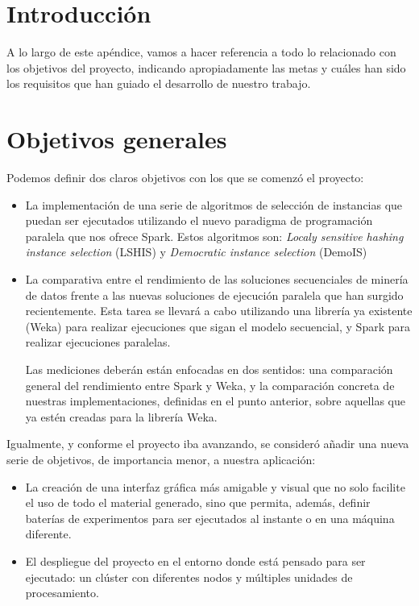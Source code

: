 

\section{Introducción}

A lo largo de este apéndice, vamos a hacer referencia a todo lo relacionado con los objetivos del proyecto, indicando apropiadamente las metas y cuáles han sido los requisitos que han guiado el desarrollo de nuestro trabajo.

\section{Objetivos generales}

Podemos definir dos claros objetivos con los que se comenzó el proyecto:
\begin{itemize}

\item La implementación de una serie de algoritmos de selección de instancias que puedan ser ejecutados utilizando el nuevo paradigma de programación paralela que nos ofrece Spark. Estos algoritmos son: \textit{Localy sensitive hashing instance selection} (LSHIS) \cite{LSHISPaper} y \textit{Democratic instance selection} (DemoIS) \cite{DemoISPaper}

\item La comparativa entre el rendimiento de las soluciones secuenciales de minería de datos frente a las nuevas soluciones de ejecución paralela que han surgido recientemente. Esta tarea se llevará a cabo utilizando una librería ya existente (Weka) para realizar ejecuciones que sigan el modelo secuencial, y Spark para realizar ejecuciones paralelas.

Las mediciones deberán están enfocadas en dos sentidos: una comparación general del rendimiento entre Spark y Weka, y la comparación concreta de nuestras implementaciones, definidas en el punto anterior, sobre aquellas que ya estén creadas para la librería Weka.
\end{itemize}

Igualmente, y conforme el proyecto iba avanzando, se consideró añadir una nueva serie de objetivos, de importancia menor, a nuestra aplicación:

\begin{itemize}
\item La creación de una interfaz gráfica más amigable y visual que no solo facilite el uso de todo el material generado, sino que permita, además, definir baterías de experimentos para ser ejecutados al instante o en una máquina diferente.
\item El despliegue del proyecto en el entorno donde está pensado para ser ejecutado: un clúster con diferentes nodos y múltiples unidades de procesamiento.
\end{itemize}

